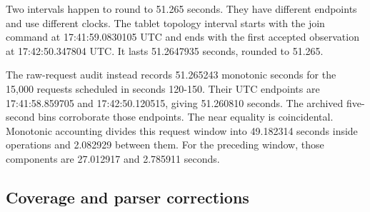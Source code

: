 Two intervals happen to round to 51.265 seconds. They have different endpoints and use different clocks. The tablet topology interval starts with the join command at 17:41:59.0830105 UTC and ends with the first accepted observation at 17:42:50.347804 UTC. It lasts 51.2647935 seconds, rounded to 51.265.

The raw-request audit instead records 51.265243 monotonic seconds for the 15,000 requests scheduled in seconds 120-150. Their UTC endpoints are 17:41:58.859705 and 17:42:50.120515, giving 51.260810 seconds. The archived five-second bins corroborate those endpoints. The near equality is coincidental. Monotonic accounting divides this request window into 49.182314 seconds inside operations and 2.082929 between them. For the preceding window, those components are 27.012917 and 2.785911 seconds.

\hypertarget{coverage-and-parser-corrections}{%
\subsection{Coverage and parser
corrections}\label{coverage-and-parser-corrections}}

